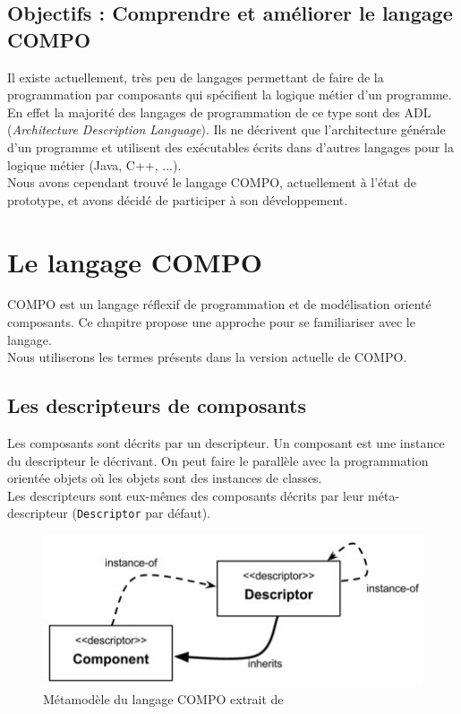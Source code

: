 \documentclass[11pt,a4paper,openany,oneside]{book}
\begin{document}
\section{Objectifs : Comprendre et améliorer le langage COMPO}

Il existe actuellement, très peu de langages  permettant de faire de la programmation par composants qui spécifient la logique métier d'un programme. En effet la majorité des langages de programmation de ce type sont des ADL (\textit{Architecture Description Language}). Ils ne décrivent que l'architecture générale d'un programme et utilisent des exécutables écrits dans d'autres langages pour la logique métier (Java, C++, ...).\\ 
Nous avons cependant trouvé le langage COMPO, actuellement à l'état de prototype, et avons décidé de participer à son développement.

\chapter{Le langage COMPO}

COMPO est un langage réflexif de programmation et de modélisation orienté composants. Ce chapitre propose une approche pour se familiariser avec le langage.\\
Nous utiliserons les termes présents dans la version actuelle de COMPO.

\section{Les descripteurs de composants}

Les composants sont décrits par un descripteur. Un composant est une instance du descripteur le décrivant. On peut faire le parallèle avec la programmation orientée objets où les objets sont des instances de classes.\\
Les descripteurs sont eux-mêmes des composants décrits par leur méta-descripteur (\texttt{Descriptor} par défaut).

\begin{figure}[H]
	\centering
	\includegraphics[keepaspectratio = true]{metamodel}
	\caption{Métamodèle du langage COMPO extrait de \citep{these}}
	\label{MetaModel}
\end{figure}
\end{document}
